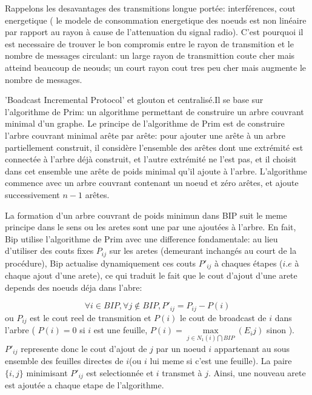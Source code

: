   Rappelons les desavantages des transmitions longue portée: interférences, cout energetique ( le modele de consommation energetique des noeuds est non linéaire par rapport au rayon à cause de l'attenuation du signal radio).
C'est pourquoi il est necessaire de trouver le bon compromis entre le rayon de transmition et le nombre de messages circulant: un large rayon de transmittion coute cher mais atteind beaucoup de neouds; un court rayon cout tres peu cher mais 
augmente le nombre de messages. 

'Boadcast Incremental Protocol' et glouton et centralisé.Il se base sur l'algorithme de Prim: un algorithme permettant de construire un arbre couvrant minimal d'un graphe. Le principe de l'algorithme de Prim est de construire l'arbre couvrant minimal arête par arête: pour ajouter une 
arête à un arbre partiellement construit, il considère l'ensemble des arêtes dont une extrémité est
connectée à l'arbre déjà construit, et l'autre extrémité ne l'est pas, et
il choisit dans cet ensemble une arête de poids minimal qu'il ajoute à l'arbre. L'algorithme commence avec un arbre couvrant contenant un noeud et zéro arêtes, et ajoute successivement $n-1$ arêtes.

La formation d'un arbre couvrant de poids minimun dans BIP suit le meme principe dans le sens ou les aretes sont une par une ajoutées à l'arbre.
En fait, Bip utilise l'algorithme de Prim avec une difference fondamentale: au lieu d'utiliser des couts fixes $P_{ij}$ sur les aretes (demeurant inchangés au court de la procédure),
Bip actualise dynamiquement ces couts $P'_{ij}$ à chaques étapes ($i.e$ à chaque ajout d'une arete), ce qui traduit le fait que le cout d'ajout d'une arete depends des noeuds déja dans l'abre:

$$ \forall i \in BIP, \forall j \notin BIP, P'_{ij}=P_{ij}-P(i)$$
ou $P_{ij}$ est le cout reel de transmition et $P(i)$ le cout de broadcast de $i$ dans l'arbre ( $P(i)=0$ si $i$ est une feuille, $P(i)=\max\limits_{j\in N_1(i)\bigcap BIP}(E_ij)$ sinon ). $P'_{ij}$ represente donc le cout d'ajout de $j$ par un noeud $i$ appartenant au sous ensemble des feuilles
directes de $i$(ou $i$ lui meme si c'est une feuille). La paire $\{i,j\}$ minimisant $P'_{ij}$ est selectionnée et $i$ transmet à $j$. Ainsi, une nouveau arete est ajoutée a chaque etape de l'algorithme.\\



